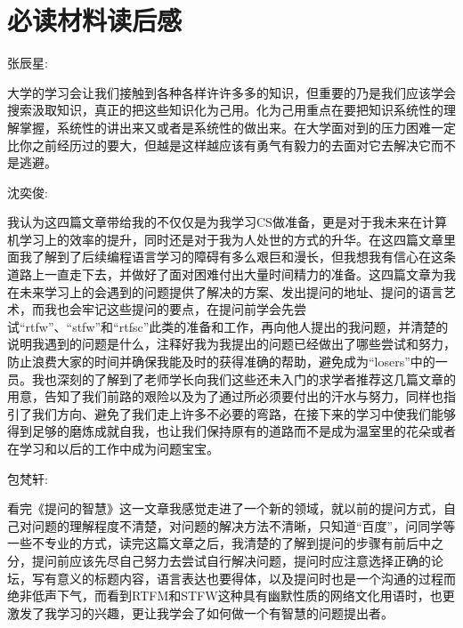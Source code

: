\documentclass{cs202}
\begin{document}


\makecover















\section{必读材料读后感}
张辰星: 

大学的学习会让我们接触到各种各样许许多多的知识，但重要的乃是我们应该学会搜索汲取知识，真正的把这些知识化为己用。化为己用重点在要把知识系统性的理解掌握，系统性的讲出来又或者是系统性的做出来。在大学面对到的压力困难一定比你之前经历过的要大，但越是这样越应该有勇气有毅力的去面对它去解决它而不是逃避。


沈奕俊:


我认为这四篇文章带给我的不仅仅是为我学习CS做准备，更是对于我未来在计算机学习上的效率的提升，同时还是对于我为人处世的方式的升华。在这四篇文章里面我了解到了后续编程语言学习的障碍有多么艰巨和漫长，但我想我有信心在这条道路上一直走下去，并做好了面对困难付出大量时间精力的准备。这四篇文章为我在未来学习上的会遇到的问题提供了解决的方案、发出提问的地址、提问的语言艺术，而我也会牢记这些提问的要点，在提问前学会先尝试“rtfw”、“stfw”和“rtfsc”此类的准备和工作，再向他人提出的我问题，并清楚的说明我遇到的问题是什么，注释好我为我提出的问题已经做出了哪些尝试和努力，防止浪费大家的时间并确保我能及时的获得准确的帮助，避免成为“losers”中的一员。我也深刻的了解到了老师学长向我们这些还未入门的求学者推荐这几篇文章的用意，告知了我们前路的艰险以及为了通过所必须要付出的汗水与努力，同样也指引了我们方向、避免了我们走上许多不必要的弯路，在接下来的学习中使我们能够得到足够的磨炼成就自我，也让我们保持原有的道路而不是成为温室里的花朵或者在学习和以后的工作中成为问题宝宝。


包梵轩:

看完《提问的智慧》这一文章我感觉走进了一个新的领域，就以前的提问方式，自己对问题的理解程度不清楚，对问题的解决方法不清晰，只知道“百度”，问同学等一些不专业的方式，读完这篇文章之后，我清楚的了解到提问的步骤有前后中之分，提问前应该先尽自己努力去尝试自行解决问题，提问时应注意选择正确的论坛，写有意义的标题内容，语言表达也要得体，以及提问时也是一个沟通的过程而绝非低声下气，而看到RTFM和STFW这种具有幽默性质的网络文化用语时，也更激发了我学习的兴趣，更让我学会了如何做一个有智慧的问题提出者。
\end{document}
